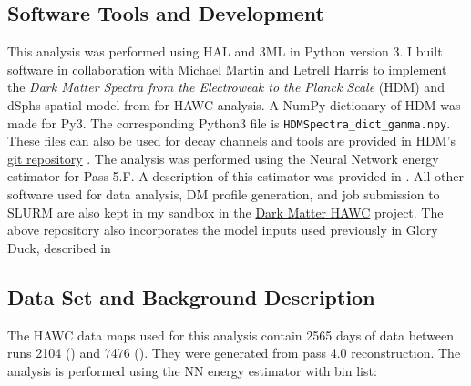 \subsection{Software Tools and Development}\label{sec:mtd_tools}

This analysis was performed using HAL and 3ML \cite{Abeysekara_2017, vianello2015multimission} in Python version 3.
I built software in collaboration with Michael Martin and Letrell Harris to implement the \emph{Dark Matter Spectra from the Electroweak to the Planck Scale} (HDM) \cite{HDMSpectra} and dSphs spatial model from \cite{DM_Strigari20} for HAWC analysis.
A NumPy dictionary of HDM was made for Py3.
The corresponding Python3 file is \texttt{HDMSpectra\_dict\_gamma.npy}.
These files can also be used for decay channels and tools are provided in HDM's \href{https://github.com/nickrodd/HDMSpectra/tree/master}{git repository} \cite{HDMSpectra}.
The analysis was performed using the Neural Network energy estimator for Pass 5.F.
A description of this estimator was provided in .
All other software used for data analysis, DM profile generation, and job submission to SLURM are also kept in my sandbox in the \href{https://gitlab.com/hawc-observatory/sandboxes/salaza82/dark_matter_hawc}{Dark Matter HAWC} project.
The above repository also incorporates the model inputs used previously in Glory Duck, described in 

\subsection{Data Set and Background Description} \label{sec:mtd_data_bkgd}

The HAWC data maps used for this analysis contain 2565 days of data between runs 2104 () and 7476 ().
They were generated from pass 4.0 reconstruction.
The analysis is performed using the NN energy estimator with bin list:

